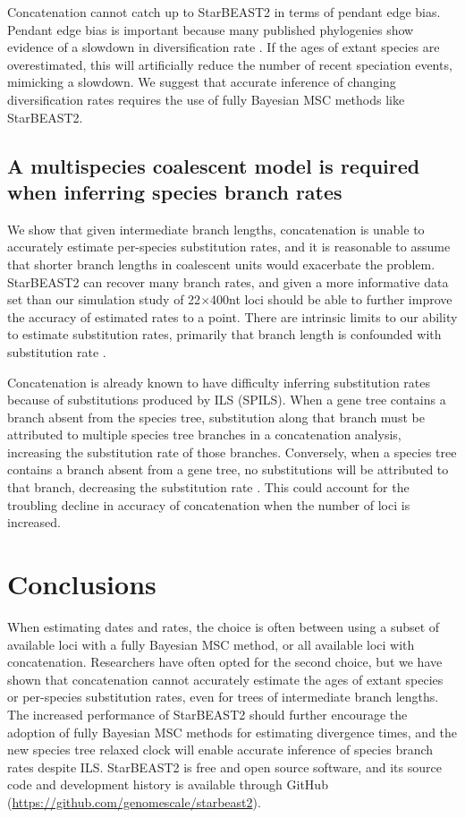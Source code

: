 \documentclass[nogrid]{MBE}%
\begin{document}
Concatenation cannot catch up to StarBEAST2 in terms of pendant edge bias.
Pendant edge bias is important because many published phylogenies show evidence
of a slowdown in diversification rate \citep{Moen2014190}. If the ages of extant
species are overestimated, this will artificially reduce the number of recent
speciation events, mimicking a slowdown. We suggest that accurate inference of
changing diversification rates requires the use of fully Bayesian MSC methods
like StarBEAST2.

\subsection{A multispecies coalescent model is required when inferring species branch rates}

We show that given intermediate branch lengths, concatenation is unable to
accurately estimate per-species substitution rates, and it is reasonable to
assume that shorter branch lengths in coalescent units would exacerbate the
problem. StarBEAST2 can recover many branch rates, and given a more informative
data set than our simulation study of 22$\times$400nt loci should be able to
further improve the accuracy of estimated rates to a point. There are intrinsic
limits to our ability to estimate substitution rates, primarily that branch
length is confounded with substitution rate \citep{Thorne01092002}.

Concatenation is already known to have difficulty inferring substitution rates
because of substitutions produced by ILS (SPILS). When a gene tree contains a
branch absent from the species tree, substitution along that branch must be
attributed to multiple species tree branches in a concatenation analysis,
increasing the substitution rate of those branches. Conversely, when a species
tree contains a branch absent from a gene tree, no substitutions will be
attributed to that branch, decreasing the substitution rate
\citep{Mendes28022016}. This could account for the troubling decline in accuracy
of concatenation when the number of loci is increased.

\section{Conclusions}

When estimating dates and rates, the choice is often between using a subset of
available loci with a fully Bayesian MSC method, or all available loci with
concatenation. Researchers have often opted for the second choice, but we have
shown that concatenation cannot accurately estimate the ages of extant species
or per-species substitution rates, even for trees of intermediate branch lengths. The
increased performance of StarBEAST2 should further encourage the adoption of
fully Bayesian MSC methods for estimating divergence times, and the new species
tree relaxed clock will enable accurate inference of species branch rates despite
ILS. StarBEAST2 is free and open source software, and its source code and
development history is available through GitHub
(\url{https://github.com/genomescale/starbeast2}).
\end{document}
